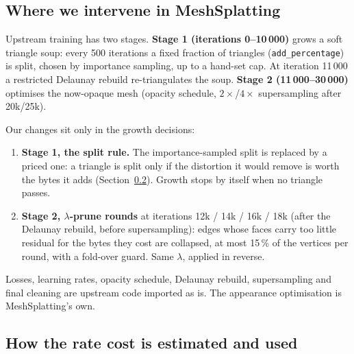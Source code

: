 \documentclass[11pt,a4paper]{article}
\begin{document}
\subsection{Where we intervene in MeshSplatting}

Upstream training has two stages. \textbf{Stage 1 (iterations 0--10\,000)} grows a soft triangle soup: every 500 iterations a fixed fraction of triangles (\texttt{add\_percentage}) is split, chosen by importance sampling, up to a hand-set cap. At iteration 11\,000 a restricted Delaunay rebuild re-triangulates the soup. \textbf{Stage 2 (11\,000--30\,000)} optimises the now-opaque mesh (opacity schedule, $2\times$/$4\times$ supersampling after 20k/25k).

Our changes sit only in the growth decisions:
\begin{enumerate}[nosep,leftmargin=*]
  \item \textbf{Stage 1, the split rule.} The importance-sampled split is replaced by a priced one: a triangle is split only if the distortion it would remove is worth the bytes it adds (Section~\ref{sec:rate}). Growth stops by itself when no triangle passes.
  \item \textbf{Stage 2, $\lambda$-prune rounds} at iterations 12k / 14k / 16k / 18k (after the Delaunay rebuild, before supersampling): edges whose faces carry too little residual for the bytes they cost are collapsed, at most 15\,\% of the vertices per round, with a fold-over guard. Same $\lambda$, applied in reverse.
\end{enumerate}
Losses, learning rates, opacity schedule, Delaunay rebuild, supersampling and final cleaning are upstream code imported as is. The appearance optimisation is MeshSplatting's own.

\subsection{How the rate cost is estimated and used}
\label{sec:rate}
\end{document}

